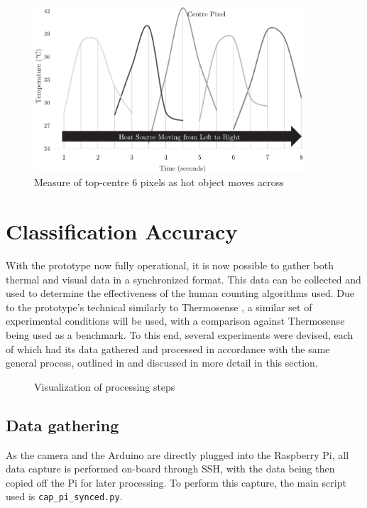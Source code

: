\documentclass[../thesis/thesis.tex]{subfiles}
\begin{document}
\begin{figure}
\centering
\includegraphics[width=0.9\textwidth]{../diagrams/03_hot_water_top_row_modified.pdf}
\caption{Measure of top-centre 6 \mlx pixels as hot object moves across}
\label{fig:hotmotion}
\end{figure}

\section{Classification Accuracy}

With the prototype now fully operational, it is now possible to gather both thermal and visual data in a synchronized format. This data can be collected and used to determine the effectiveness of the human counting algorithms used. Due to the prototype's technical similarly to Thermosense \cite{beltran2013thermosense}, a similar set of experimental conditions will be used, with a comparison against Thermosense being used as a benchmark. To this end, several experiments were devised, each of which had its data gathered and processed in accordance with the same general process, outlined in  and discussed in more detail in this section.

\begin{figure}
\centering

\caption{Visualization of processing steps}
\label{fig:methods:flowchart}
\end{figure}

\subsection{Data gathering}
As the camera and the Arduino are directly plugged into the Raspberry Pi, all data capture is performed on-board through SSH, with the data being then copied off the Pi for later processing. To perform this capture, the main script used is \texttt{cap\_pi\_synced.py}.
\end{document}
